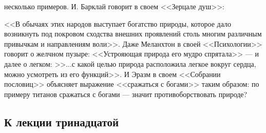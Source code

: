 \documentclass[12pt]{article}
\begin{document}
несколько примеров. И. Барклай говорит в своем <<Зерцале душ>>: 

<<В обычаях этих народов выступает богатство природы, которое дало возникнуть под покровом сходства внешних проявлений столь многим различным привычкам и направлениям воли>>. Даже Меланхтон в своей <<Психологии>> говорит о желчном пузыре: <<Устрояющая природа его мудро спрятала>>  --- и далее о легком: >>...с какой целью природа расположила легкое вокруг сердца, можно усмотреть из его функций>>. И Эразм в своем <<Собрании пословиц>> объясняет выражение <<сражаться с богами>> таким образом: по примеру титанов сражаться с богами --- значит противоборствовать природе? 

\subsection*{К лекции тринадцатой} 
\end{document}
